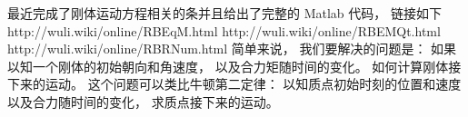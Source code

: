 

\begin{issues}
\issueDraft
\end{issues}

最近完成了刚体运动方程相关的条并且给出了完整的 Matlab 代码， 链接如下
http://wuli.wiki/online/RBEqM.html
http://wuli.wiki/online/RBEMQt.html
http://wuli.wiki/online/RBRNum.html
简单来说， 我们要解决的问题是： 如果以知一个刚体的初始朝向和角速度， 以及合力矩随时间的变化。 如何计算刚体接下来的运动。 这个问题可以类比牛顿第二定律： 以知质点初始时刻的位置和速度以及合力随时间的变化， 求质点接下来的运动。
